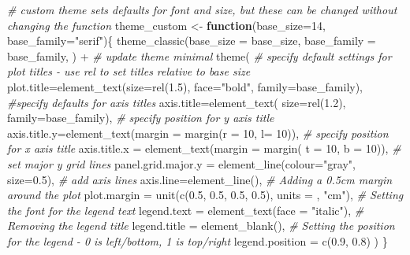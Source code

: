 \documentclass[
]{book}
\newenvironment{Shaded}{\begin{snugshade}}{\end{snugshade}}
\newcommand{\AttributeTok}[1]{\textcolor[rgb]{0.77,0.63,0.00}{#1}}
\newcommand{\CommentTok}[1]{\textcolor[rgb]{0.56,0.35,0.01}{\textit{#1}}}
\newcommand{\ControlFlowTok}[1]{\textcolor[rgb]{0.13,0.29,0.53}{\textbf{#1}}}
\newcommand{\DecValTok}[1]{\textcolor[rgb]{0.00,0.00,0.81}{#1}}
\newcommand{\FloatTok}[1]{\textcolor[rgb]{0.00,0.00,0.81}{#1}}
\newcommand{\FunctionTok}[1]{\textcolor[rgb]{0.00,0.00,0.00}{#1}}
\newcommand{\NormalTok}[1]{#1}
\newcommand{\OtherTok}[1]{\textcolor[rgb]{0.56,0.35,0.01}{#1}}
\newcommand{\SpecialCharTok}[1]{\textcolor[rgb]{0.00,0.00,0.00}{#1}}
\newcommand{\StringTok}[1]{\textcolor[rgb]{0.31,0.60,0.02}{#1}}
\begin{document}
\begin{Shaded}
\begin{Highlighting}[]
\CommentTok{\# custom theme sets defaults for font and size, but these can be changed without changing the function}
\NormalTok{theme\_custom }\OtherTok{\textless{}{-}} \ControlFlowTok{function}\NormalTok{(}\AttributeTok{base\_size=}\DecValTok{14}\NormalTok{, }\AttributeTok{base\_family=}\StringTok{"serif"}\NormalTok{)\{}
  \FunctionTok{theme\_classic}\NormalTok{(}\AttributeTok{base\_size =}\NormalTok{ base\_size, }
                \AttributeTok{base\_family =}\NormalTok{ base\_family,}
\NormalTok{                ) }\SpecialCharTok{+}
\CommentTok{\# update theme minimal }
\FunctionTok{theme}\NormalTok{(}
  \CommentTok{\# specify default settings for plot titles {-} use rel to set titles relative to base size}
  \AttributeTok{plot.title=}\FunctionTok{element\_text}\NormalTok{(}\AttributeTok{size=}\FunctionTok{rel}\NormalTok{(}\FloatTok{1.5}\NormalTok{),}
      \AttributeTok{face=}\StringTok{"bold"}\NormalTok{,}
      \AttributeTok{family=}\NormalTok{base\_family),}
  \CommentTok{\#specify defaults for axis titles}
  \AttributeTok{axis.title=}\FunctionTok{element\_text}\NormalTok{(}
    \AttributeTok{size=}\FunctionTok{rel}\NormalTok{(}\FloatTok{1.2}\NormalTok{),}
    \AttributeTok{family=}\NormalTok{base\_family),}
  \CommentTok{\# specify position for y axis title}
  \AttributeTok{axis.title.y=}\FunctionTok{element\_text}\NormalTok{(}\AttributeTok{margin =} \FunctionTok{margin}\NormalTok{(}\AttributeTok{r =} \DecValTok{10}\NormalTok{, }\AttributeTok{l=} \DecValTok{10}\NormalTok{)),}
  \CommentTok{\# specify position for x axis title}
  \AttributeTok{axis.title.x =} \FunctionTok{element\_text}\NormalTok{(}\AttributeTok{margin =} \FunctionTok{margin}\NormalTok{( }\AttributeTok{t =} \DecValTok{10}\NormalTok{, }\AttributeTok{b =} \DecValTok{10}\NormalTok{)),}
  \CommentTok{\# set major y grid lines}
  \AttributeTok{panel.grid.major.y =} \FunctionTok{element\_line}\NormalTok{(}\AttributeTok{colour=}\StringTok{"gray"}\NormalTok{, }\AttributeTok{size=}\FloatTok{0.5}\NormalTok{),}
  \CommentTok{\# add axis lines}
  \AttributeTok{axis.line=}\FunctionTok{element\_line}\NormalTok{(),}
   \CommentTok{\# Adding a 0.5cm margin around the plot}
  \AttributeTok{plot.margin =} \FunctionTok{unit}\NormalTok{(}\FunctionTok{c}\NormalTok{(}\FloatTok{0.5}\NormalTok{, }\FloatTok{0.5}\NormalTok{, }\FloatTok{0.5}\NormalTok{, }\FloatTok{0.5}\NormalTok{), }\AttributeTok{units =}\NormalTok{ , }\StringTok{"cm"}\NormalTok{),    }
   \CommentTok{\# Setting the font for the legend text}
  \AttributeTok{legend.text =} \FunctionTok{element\_text}\NormalTok{(}\AttributeTok{face =} \StringTok{"italic"}\NormalTok{),   }
    \CommentTok{\# Removing the legend title}
          \AttributeTok{legend.title =} \FunctionTok{element\_blank}\NormalTok{(),    }
   \CommentTok{\# Setting the position for the legend {-} 0 is left/bottom, 1 is top/right}
          \AttributeTok{legend.position =} \FunctionTok{c}\NormalTok{(}\FloatTok{0.9}\NormalTok{, }\FloatTok{0.8}\NormalTok{)             }
\NormalTok{)}
\NormalTok{\}}
\end{Highlighting}
\end{Shaded}
\end{document}
